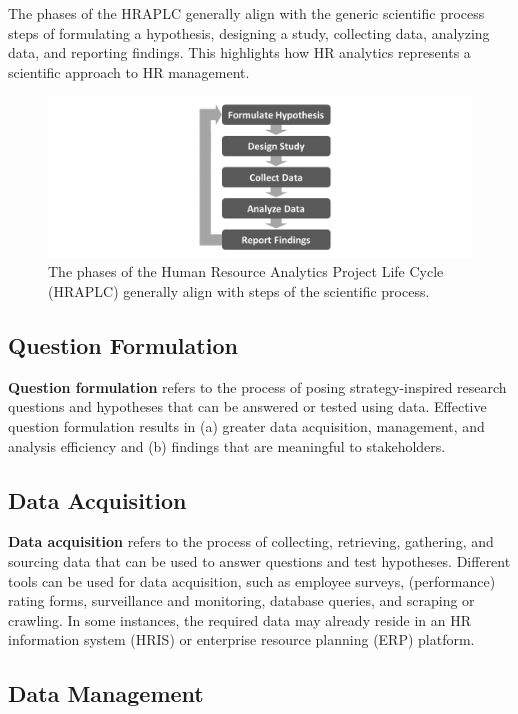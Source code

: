 \documentclass[]{book}
\begin{document}
The phases of the HRAPLC generally align with the generic scientific
process steps of formulating a hypothesis, designing a study, collecting
data, analyzing data, and reporting findings. This highlights how HR
analytics represents a scientific approach to HR management.

\begin{figure}
\centering
\includegraphics{scientificprocess.png}
\caption{The phases of the Human Resource Analytics Project Life Cycle
(HRAPLC) generally align with steps of the scientific process.}
\end{figure}

\subsection{Question Formulation}\label{questform}

\textbf{Question formulation} refers to the process of posing
strategy-inspired research questions and hypotheses that can be answered
or tested using data. Effective question formulation results in (a)
greater data acquisition, management, and analysis efficiency and (b)
findings that are meaningful to stakeholders.

\hypertarget{dacquire}{\subsection{Data Acquisition}\label{dacquire}}

\textbf{Data acquisition} refers to the process of collecting,
retrieving, gathering, and sourcing data that can be used to answer
questions and test hypotheses. Different tools can be used for data
acquisition, such as employee surveys, (performance) rating forms,
surveillance and monitoring, database queries, and scraping or crawling.
In some instances, the required data may already reside in an HR
information system (HRIS) or enterprise resource planning (ERP)
platform.

\hypertarget{dmanage}{\subsection{Data Management}\label{dmanage}}
\end{document}

